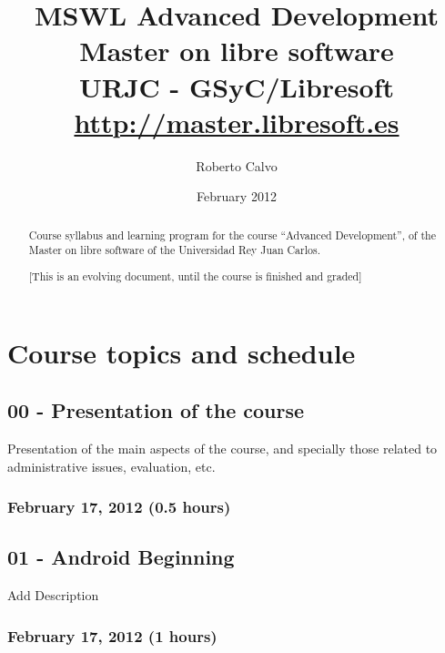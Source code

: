 \documentclass[a4paper]{article}
\title{MSWL Advanced Development \\
Master on libre software \\
URJC - GSyC/Libresoft \\
\url{http://master.libresoft.es}}
\author{Roberto Calvo}
\date{February 2012}
\begin{document}
\maketitle

\begin{abstract}
Course syllabus and learning program for the course ``Advanced
Development'', of the Master on libre software of the Universidad Rey
Juan Carlos.


[This is an evolving document, until the course is finished and graded]
\end{abstract}

\tableofcontents

\section{Course topics and schedule}

\subsection{00 - Presentation of the course}

Presentation of the main aspects of the course, and specially those
related to administrative issues, evaluation, etc.

\subsubsection{February 17, 2012 (0.5 hours)}


\subsection{01 - Android Beginning}

Add Description

\subsubsection{February 17, 2012 (1 hours)}
\end{document}
